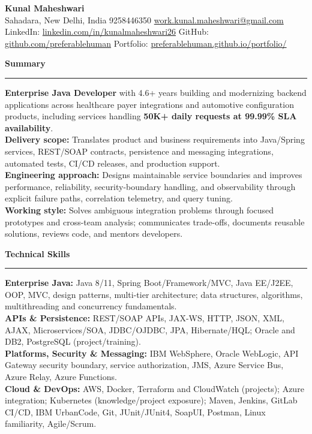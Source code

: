 \documentclass[11pt,letterpaper]{article}
\newcommand{\ressection}[1]{\Needspace{6\baselineskip}\vspace{8pt}\par\textbf{#1}\par\vspace{2pt}\hrule\vspace{5pt}}
\begin{document}
\pagestyle{empty}\raggedright\fontsize{11}{12.5}\selectfont

{\Large \textbf{Kunal Maheshwari}}\\
Sahadara, New Delhi, India \textbar{} 9258446350 \textbar{} \href{mailto:work.kunal.maheshwari@gmail.com}{work.kunal.maheshwari@gmail.com}\\
LinkedIn: \href{https://www.linkedin.com/in/kunalmaheshwari26}{linkedin.com/in/kunalmaheshwari26} \textbar{} GitHub: \href{https://github.com/preferablehuman}{github.com/preferablehuman} \textbar{} Portfolio: \href{https://preferablehuman.github.io/portfolio/}{preferablehuman.github.io/portfolio/}

\ressection{Summary}
\textbf{Enterprise Java Developer} with 4.6+ years building and modernizing backend applications across healthcare payer integrations and automotive configuration products, including services handling \textbf{50K+ daily requests at 99.99\% SLA availability}.\\[2pt]
\textbf{Delivery scope:} Translates product and business requirements into Java/Spring services, REST/SOAP contracts, persistence and messaging integrations, automated tests, CI/CD releases, and production support.\\[2pt]
\textbf{Engineering approach:} Designs maintainable service boundaries and improves performance, reliability, security-boundary handling, and observability through explicit failure paths, correlation telemetry, and query tuning.\\[2pt]
\textbf{Working style:} Solves ambiguous integration problems through focused prototypes and cross-team analysis; communicates trade-offs, documents reusable solutions, reviews code, and mentors developers.

\ressection{Technical Skills}
\textbf{Enterprise Java:} Java 8/11, Spring Boot/Framework/MVC, Java EE/J2EE, OOP, MVC, design patterns, multi-tier architecture; data structures, algorithms, multithreading and concurrency fundamentals.\\
\textbf{APIs \& Persistence:} REST/SOAP APIs, JAX-WS, HTTP, JSON, XML, AJAX, Microservices/SOA, JDBC/OJDBC, JPA, Hibernate/HQL; Oracle and DB2, PostgreSQL (project/training).\\
\textbf{Platforms, Security \& Messaging:} IBM WebSphere, Oracle WebLogic, API Gateway security boundary, service authorization, JMS, Azure Service Bus, Azure Relay, Azure Functions.\\
\textbf{Cloud \& DevOps:} AWS, Docker, Terraform and CloudWatch (projects); Azure integration; Kubernetes (knowledge/project exposure); Maven, Jenkins, GitLab CI/CD, IBM UrbanCode, Git, JUnit/JUnit4, SoapUI, Postman, Linux familiarity, Agile/Scrum.
\end{document}
